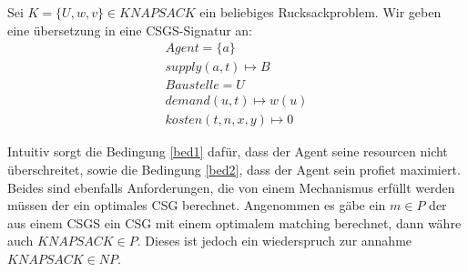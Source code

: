 Sei $K=\{U,w,v\}\in KNAPSACK$ ein beliebiges Rucksackproblem. Wir geben eine übersetzung in eine CSGS-Signatur an:
\begin{align}
  Agent = \{a\} \\
  supply(a, t) \mapsto B \\
  Baustelle = U \\
  demand(u, t) \mapsto w(u) \\
  kosten(t, n, x, y) \mapsto 0
\end{align}

Intuitiv sorgt die Bedingung \ref{bed1} dafür, dass der Agent seine resourcen nicht überschreitet, sowie die Bedingung \ref{bed2}, dass der Agent sein profiet maximiert. Beides sind ebenfalls Anforderungen, die von einem Mechanismus erfüllt werden müssen der ein optimales CSG berechnet.
Angenommen es gäbe ein $m\in P$ der aus einem CSGS ein CSG mit einem optimalem matching berechnet, dann währe auch $KNAPSACK\in P$. Dieses ist jedoch ein wiederspruch zur annahme $KNAPSACK\in NP$.
